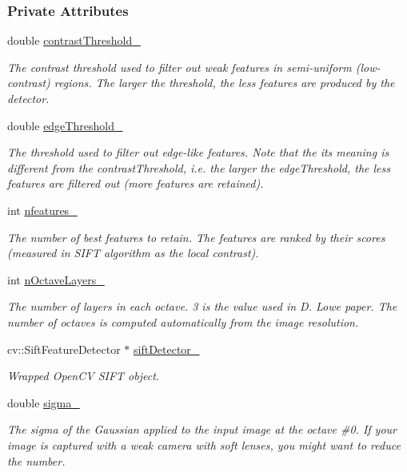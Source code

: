 \subsubsection*{Private Attributes}
\begin{DoxyCompactItemize}
\item 
double \hyperlink{group___feature_extractor_af2a77eef4388e7b3504142218baee770}{contrast\-Threshold\-\_\-}
\begin{DoxyCompactList}\small\item\em The contrast threshold used to filter out weak features in semi-\/uniform (low-\/contrast) regions. The larger the threshold, the less features are produced by the detector. \end{DoxyCompactList}\item 
double \hyperlink{group___feature_extractor_a8fc64eb5826c05c5fe8c0893cc24ff0a}{edge\-Threshold\-\_\-}
\begin{DoxyCompactList}\small\item\em The threshold used to filter out edge-\/like features. Note that the its meaning is different from the contrast\-Threshold, i.\-e. the larger the edge\-Threshold, the less features are filtered out (more features are retained). \end{DoxyCompactList}\item 
int \hyperlink{group___feature_extractor_a7b777845234b488ea905bd38f7ce323c}{nfeatures\-\_\-}
\begin{DoxyCompactList}\small\item\em The number of best features to retain. The features are ranked by their scores (measured in S\-I\-F\-T algorithm as the local contrast). \end{DoxyCompactList}\item 
int \hyperlink{group___feature_extractor_aaf3149accfb0860cb148ea21cda53c12}{n\-Octave\-Layers\-\_\-}
\begin{DoxyCompactList}\small\item\em The number of layers in each octave. 3 is the value used in D. Lowe paper. The number of octaves is computed automatically from the image resolution. \end{DoxyCompactList}\item 
cv\-::\-Sift\-Feature\-Detector $\ast$ \hyperlink{group___feature_extractor_a4e08df2e30da758a11d029eae0352cf5}{sift\-Detector\-\_\-}
\begin{DoxyCompactList}\small\item\em Wrapped Open\-C\-V S\-I\-F\-T object. \end{DoxyCompactList}\item 
double \hyperlink{group___feature_extractor_a574fb46dbb906801014beb9a731b980a}{sigma\-\_\-}
\begin{DoxyCompactList}\small\item\em The sigma of the Gaussian applied to the input image at the octave \#0. If your image is captured with a weak camera with soft lenses, you might want to reduce the number. \end{DoxyCompactList}\end{DoxyCompactItemize}


